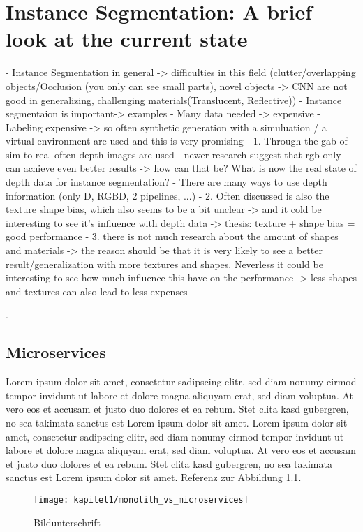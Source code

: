 \listoftodos

\chapter{Instance Segmentation: A brief look at the current state}
\label{chap:kapitel1}
- Instance Segmentation in general -> difficulties in this field (clutter/overlapping objects/Occlusion (you only can see small parts), novel objects -> CNN are not good in generalizing, challenging materials(Translucent, Reflective))
- Instance segmentaion is important-> examples
- Many data needed -> expensive
- Labeling expensive -> so often synthetic generation with a simuluation / a virtual environment are used and this is very promising
- 1. Through the gab of sim-to-real often depth images are used
- newer research suggest that rgb only can achieve even better results -> how can that be? What is now the real state of depth data for instance segmentation?
- There are many ways to use depth information (only D, RGBD, 2 pipelines, ...)
- 2. Often discussed is also the texture shape bias, which also seems to be a bit unclear -> and it cold be interesting to see it's influence with depth data -> thesis: texture + shape bias = good performance
- 3. there is not much research about the amount of shapes and materials -> the reason should be that it is very likely to see a better result/generalization with more textures and shapes. Neverless it could be interesting to see how much influence this have on the performance -> less shapes and textures can also lead to less expenses

 \cite{Fowler2014}.

	\section{Microservices}
	\label{sec:microservices}
	Lorem ipsum dolor sit amet, consetetur sadipscing elitr, sed diam nonumy eirmod tempor invidunt ut labore et dolore magna aliquyam erat, sed diam voluptua. At vero eos et accusam et justo duo dolores et ea rebum. Stet clita kasd gubergren, no sea takimata sanctus est Lorem ipsum dolor sit amet. Lorem ipsum dolor sit amet, consetetur sadipscing elitr, sed diam nonumy eirmod tempor invidunt ut labore et dolore magna aliquyam erat, sed diam voluptua. At vero eos et accusam et justo duo dolores et ea rebum. Stet clita kasd gubergren, no sea takimata sanctus est Lorem ipsum dolor sit amet. Referenz zur Abbildung \ref{img:microprofile}.
	\begin{figure}[h]
		\centering
		\texttt{[image: kapitel1/monolith\_vs\_microservices]}
		\caption[Beschreibung für Verzeichnis]{Bildunterschrift}
		\label{img:microprofile}
	\end{figure}
	

